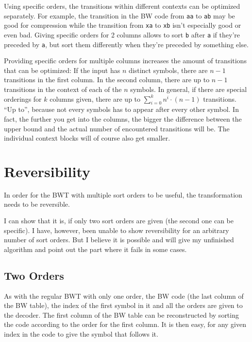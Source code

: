 \documentclass[a4paper]{scrreprt}
\begin{document}
Using specific orders, the transitions within different contexts can be
optimized separately. For example, the transition in the BW code from
\texttt{aa} to \texttt{ab} may be good for compression while the transition
from \texttt{xa} to \texttt{xb} isn't especially good or even bad. Giving
specific orders for 2 columns allows to sort \texttt{b} after \texttt{a} if
they're preceded by \texttt{a}, but sort them differently when they're preceded
by something else.

Providing specific orders for multiple columns increases the amount of
transitions that can be optimized: If the input has \(n\) distinct symbols,
there are \(n - 1\) transitions in the first column. In the second column, there
are up to \(n - 1\) transitions in the context of each of the \(n\) symbols. In
general, if there are special orderings for \(k\) columns given, there are up to
\(\sum_{i=0}^{k} n^{i} \cdot (n - 1)\) transitions. ``Up to'', because not every
symbols has to appear after every other symbol. In fact, the further you get
into the columns, the bigger the difference between the upper bound and the
actual number of encountered transitions will be. The individual context blocks
will of course also get smaller.


\section{Reversibility}

In order for the BWT with multiple sort orders to be useful, the transformation
needs to be reversible.

I can show that it is, if only two sort orders are given (the second one can be
specific). I have, however, been unable to show reversibility for an arbitrary
number of sort orders. But I believe it is possible and will give my unfinished
algorithm and point out the part where it fails in some cases.

\subsection{Two Orders}

As with the regular BWT with only one order, the BW code (the last column of
the BW table), the index of the first symbol in it and all the orders are given
to the decoder. The first column of the BW table can be reconstructed by sorting
the code according to the order for the first column. It is then easy, for any
given index in the code to give the symbol that follows it.
\end{document}
